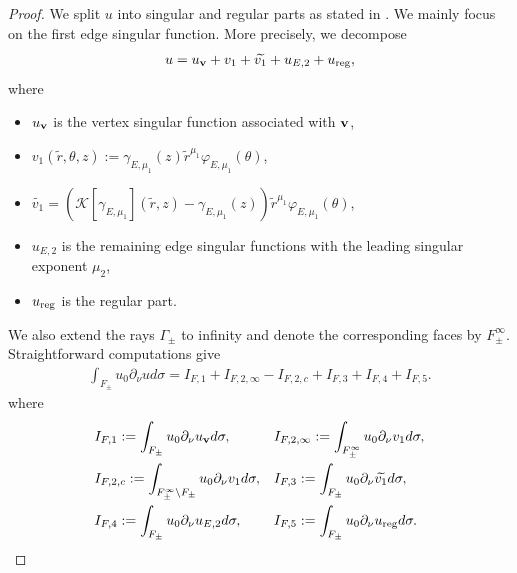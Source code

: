 ﻿\documentclass[11pt,reqno,oneside]{amsart}
\theoremstyle{definition}
\theoremstyle{remark}
\newcommand{\g}{\gamma}
\newcommand{\vf}{\varphi}
\renewcommand{\t}{\theta}
\newcommand{\p}{\partial}
\newcommand{\ds}{\displaystyle}
\begin{document}
        \begin{proof}
            We split $u$ into singular and regular parts as stated in . We mainly focus on the first edge singular function. More precisely, we decompose
            \begin{align*}
                u=u_{\bf v}+v_1+\widetilde{v_1}+u_{E,2}+u_{\rm reg},
            \end{align*}
            where 
            \begin{itemize}
                \item $u_{\bf v}$ is the vertex singular function associated with $\bf v$,
                \item $\ds v_1(\widetilde{r},\t,z):=\g_{E,\mu_1}(z)\widetilde{r}^{\mu_1}\vf_{E,\mu_1}(\t)$,
                \item $\ds \widetilde{v_1}=(\mathcal{K}[\g_{E,\mu_1}](\widetilde{r},z)-\g_{E,\mu_1}(z))\widetilde{r}^{\mu_1}\vf_{E,\mu_1}(\t)$,
                \item $u_{E,2}$ is the remaining edge singular functions with the leading singular exponent $\mu_2$,
                \item $u_{\rm reg}$ is the regular part.
            \end{itemize}
            We also extend the rays $\Gamma_\pm$ to infinity and denote the corresponding faces by $F_\pm^\infty$. Straightforward computations give
            \begin{align*}
                \int_{F_\pm} u_0\p_\nu u d\sigma = I_{F,1} + I_{F,2,\infty}-I_{F,2,c} + I_{F,3} + I_{F,4} + I_{F,5}.
            \end{align*}
            where
            \begin{align*}
                &I_{F,1} := \int_{F_{\pm}}u_0\p_\nu u_{\bf v} d\sigma, & & I_{F,2,\infty} := \int_{F_{\pm}^\infty}u_0\p_\nu v_1 d\sigma,\\
                &I_{F,2,c} := \int_{F_{\pm}^\infty\setminus F_{\pm}}u_0\p_\nu v_1 d\sigma,& & I_{F,3} := \int_{F_{\pm}}u_0\p_\nu \widetilde{v_1} d\sigma,\\
                &I_{F,4} := \int_{F_{\pm}}u_0\p_\nu u_{E,2} d\sigma, & & I_{F,5} := \int_{F_{\pm}}u_0\p_\nu u_{\rm reg} d\sigma.
            \end{align*}
            

\end{proof}
\end{document}
